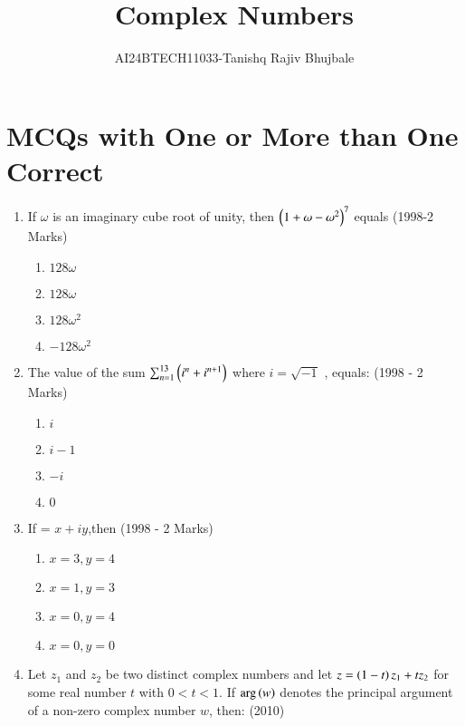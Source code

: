 \documentclass[journal,12pt,twocolumn]{IEEEtran}
\theoremstyle{remark}
\begin{document}

\vspace{3cm}
\title{Complex Numbers}
\author{AI24BTECH11033-Tanishq Rajiv Bhujbale}
\maketitle
\newpage
\bigskip

\renewcommand{\thefigure}{\theenumi}
\renewcommand{\thetable}{\theenumi}

\section{MCQs with One or More than One Correct}
\begin{enumerate}
    \item If $\omega$ is an imaginary cube root of unity, then 
    $\left(1+\omega-\omega^2\right)^7$ equals \hfill (1998-2 Marks)
    \begin{enumerate}
    \item $128\omega$    
    \item $128\omega$
    \item $128\omega^2$
    \item $-128\omega^2$
    \end{enumerate}
    \item The value of the sum 
   $\sum_{n=1}^{13} \left(i^n+i^{n+1}\right)$
where  $i=\sqrt{-1}$ , equals: \hfill (1998 - 2 Marks)
\begin{multicols}{4}
    \begin{enumerate}
    \item $i$
    \item $i - 1$
    \item $-i$
    \item $0$
    \end{enumerate}
\end{multicols}
    \item If = $x+iy$,then \hfill (1998 - 2 Marks)
\begin{enumerate}
    \item $x=3,y=4$    
    \item $x=1,y=3$ 
    \item $x=0,y=4$
    \item $x=0,y=0$
    \end{enumerate}
    \item Let $z_1$ and $z_2$ be two distinct complex numbers and let $z= \left(1-t\right)z_1+tz_2$ for some real number $t$ with $0<t<1$. If $\mathrm{arg}\left(w\right)$ denotes the principal argument of a non-zero complex number $w$, then: \hfill (2010)

\end{enumerate}
\end{document}
